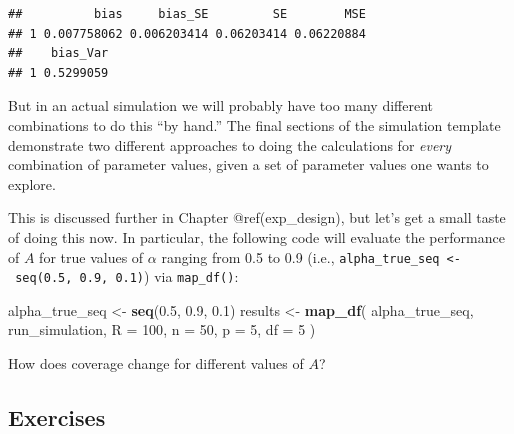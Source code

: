 \documentclass[
]{book}
\newenvironment{Shaded}{\begin{snugshade}}{\end{snugshade}}
\newcommand{\AttributeTok}[1]{\textcolor[rgb]{0.13,0.29,0.53}{#1}}
\newcommand{\DecValTok}[1]{\textcolor[rgb]{0.00,0.00,0.81}{#1}}
\newcommand{\FloatTok}[1]{\textcolor[rgb]{0.00,0.00,0.81}{#1}}
\newcommand{\FunctionTok}[1]{\textcolor[rgb]{0.13,0.29,0.53}{\textbf{#1}}}
\newcommand{\NormalTok}[1]{#1}
\newcommand{\OtherTok}[1]{\textcolor[rgb]{0.56,0.35,0.01}{#1}}
\begin{document}
\begin{verbatim}
##          bias     bias_SE         SE        MSE
## 1 0.007758062 0.006203414 0.06203414 0.06220884
##    bias_Var
## 1 0.5299059
\end{verbatim}

But in an actual simulation we will probably have too many different combinations to do this ``by hand.''
The final sections of the simulation template demonstrate two different approaches to doing the calculations for \emph{every} combination of parameter values, given a set of parameter values one wants to explore.

This is discussed further in Chapter @ref(exp\_design), but let's get a small taste of doing this now.
In particular, the following code will evaluate the performance of \(A\) for true values of \(\alpha\) ranging from 0.5 to 0.9 (i.e., \texttt{alpha\_true\_seq\ \textless{}-\ seq(0.5,\ 0.9,\ 0.1)}) via \texttt{map\_df()}:

\begin{Shaded}
\begin{Highlighting}[]
\NormalTok{alpha\_true\_seq }\OtherTok{\textless{}{-}} \FunctionTok{seq}\NormalTok{(}\FloatTok{0.5}\NormalTok{, }\FloatTok{0.9}\NormalTok{, }\FloatTok{0.1}\NormalTok{)}
\NormalTok{results }\OtherTok{\textless{}{-}} \FunctionTok{map\_df}\NormalTok{( alpha\_true\_seq, }
\NormalTok{                   run\_simulation,}
                   \AttributeTok{R =} \DecValTok{100}\NormalTok{,}
                   \AttributeTok{n =} \DecValTok{50}\NormalTok{, }\AttributeTok{p =} \DecValTok{5}\NormalTok{, }\AttributeTok{df =} \DecValTok{5}\NormalTok{ )}
\end{Highlighting}
\end{Shaded}

How does coverage change for different values of \(A\)?

\subsection{Exercises}\label{exercises-6}
\end{document}
